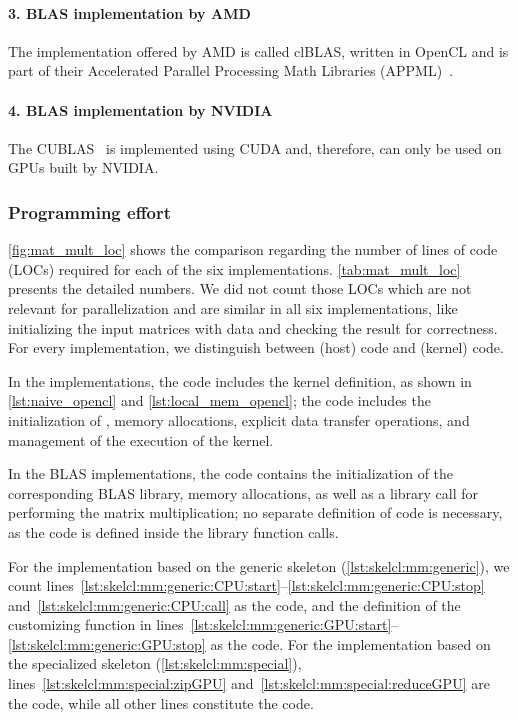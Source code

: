 \vspace{-.5em}
\paragraph{3. BLAS implementation by AMD}
The implementation offered by AMD is called clBLAS, written in OpenCL and is part of their Accelerated Parallel Processing Math Libraries (APPML)~\cite{APPML}.

\vspace{-.5em}
\paragraph{4. BLAS implementation by NVIDIA}
The CUBLAS~\cite{cuBLAS} is implemented using CUDA and, therefore, can only be used on GPUs built by NVIDIA.

\subsubsection*{Programming effort}
\autoref{fig:mat_mult_loc} shows the comparison regarding the number of lines of code (LOCs) required for each of the six implementations.
\autoref{tab:mat_mult_loc} presents the detailed numbers.
We did not count those LOCs which are not relevant for parallelization and are similar in all six implementations, like initializing the input matrices with data and checking the result for correctness.
For every implementation, we distinguish between \CPU (host) code and \GPU (kernel) code.

In the \OpenCL implementations, the \GPU code includes the kernel definition, as shown in \autoref{lst:naive_opencl} and \autoref{lst:local_mem_opencl};
the \CPU code includes the initialization of \OpenCL, memory allocations, explicit data transfer operations, and management of the execution of the kernel.

In the BLAS implementations, the \CPU code contains the initialization of the corresponding BLAS library, memory allocations, as well as a library call for performing the matrix multiplication;
no separate definition of \GPU code is necessary, as the \GPU code is defined inside the library function calls.

For the implementation based on the generic \allpairs skeleton (\autoref{lst:skelcl:mm:generic}), we count lines~\ref{lst:skelcl:mm:generic:CPU:start}--\ref{lst:skelcl:mm:generic:CPU:stop} and~\ref{lst:skelcl:mm:generic:CPU:call} as the \CPU code, and the definition of the customizing function in lines~\ref{lst:skelcl:mm:generic:GPU:start}--\ref{lst:skelcl:mm:generic:GPU:stop} as the \GPU code.
For the implementation based on the specialized \allpairs skeleton (\autoref{lst:skelcl:mm:special}), lines~\ref{lst:skelcl:mm:special:zipGPU} and~\ref{lst:skelcl:mm:special:reduceGPU} are the \GPU code, while all other lines constitute the \CPU code.


